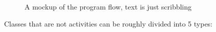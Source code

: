 \pagebreak
\begin{figure}[here]
\setlength\fboxsep{0pt}
\setlength\fboxrule{1pt}
\caption{A mockup of the program flow, text is just scribbling}
\label{fig:mockupV2}
\end{figure}

Classes that are not activities can be roughly divided into 5 types: 

